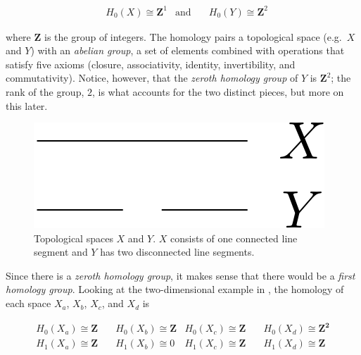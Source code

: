 \begin{align}
	& H_0(X) \cong \mathbf{Z}^1  & \text{and} & \quad H_0(Y) \cong \mathbf{Z}^2
	\label{eq:homology1d}
\end{align}

where $\mathbf{Z}$ is the group of integers. The homology pairs a topological space (e.g.\ $X$ and $Y$) with an \textit{abelian group}, a set of elements combined with operations that satisfy five axioms (closure, associativity, identity, invertibility, and commutativity). Notice, however, that the \textit{zeroth homology group} of $Y$ is $\mathbf{Z}^2$; the rank of the group, $2$, is what accounts for the two distinct pieces, but more on this later.

\begin{figure}
	\begin{center}
		\includegraphics[width=0.2\columnwidth]{Figs/homology1d.pdf}
		\caption{\label{fig:homology1d} Topological spaces $X$ and $Y$. $X$ consists of one connected line segment and $Y$ has two disconnected line segments.}
	\end{center}
\end{figure}

Since there is a \textit{zeroth homology group}, it makes sense that there would be a \textit{first homology group}. Looking at the two-dimensional example in , the homology of each space $X_a$, $X_b$, $X_c$, and $X_d$ is

\begin{align}
	H_0(X_a) \cong \mathbf{Z} & \quad H_0(X_b) \cong \mathbf{Z} & H_0(X_c) \cong \mathbf{Z} & \quad H_0(X_d) \cong \mathbf{Z^2} \\
	H_1(X_a) \cong  \mathbf{Z} & \quad H_1(X_b) \cong 0 & H_1(X_c) \cong \mathbf{Z} & \quad H_1(X_d) \cong \mathbf{Z}
	 \label{eq:homology2d} 
\end{align}

